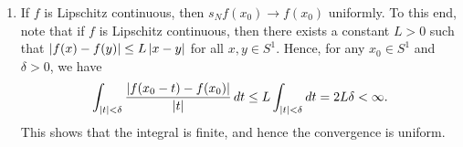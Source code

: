 \begin{enumerate}
    \item If $f$ is Lipschitz continuous, then $s_{N}f(x_{0}) \to f(x_{0})$ uniformly. To this end, note that if $f$ is Lipschitz continuous, then there exists a constant $L > 0$ such that $\left| f(x)-f(y) \right| \leq L\left| x-y \right|$ for all $x,y \in S^{1}$. Hence, for any $x_{0} \in S^{1}$ and $\delta > 0$, we have
    \begin{align}
        \int_{\left| t \right| < \delta} \frac{\left| f(x_{0}-t)-f(x_{0}) \right|}{\left| t \right|} \, dt \leq L\int_{\left| t \right| < \delta} dt = 2L\delta < \infty.
    \end{align}
    This shows that the integral is finite, and hence the convergence is uniform.
\end{enumerate}